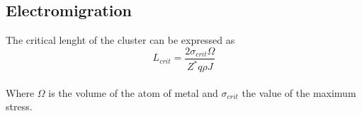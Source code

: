 
\subsection{Electromigration}
The critical lenght of the cluster can be expressed as 
\begin{equation}
L_{crit}=\frac{2\sigma_{crit}\Omega}{Z^*q\rho J}
\end{equation}
\\
Where $\Omega$ is the volume of the atom of metal and $\sigma_{crit}$ the value of the maximum stress.\\
























